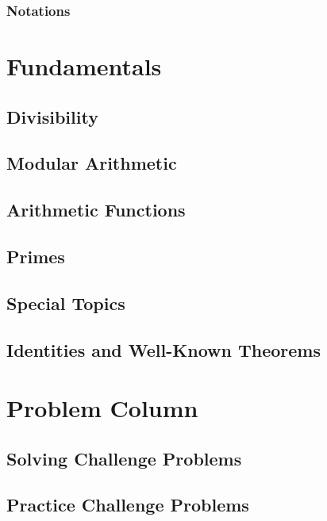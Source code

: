 \documentclass[12pt]{book}
\begin{document}
\dominitoc
\tableofcontents


\pagestyle{myfancy}
		\pagestyle{fancy}
\mainmatter
\setcounter{page}{13}
	\section*{Notations}
	
\part{Fundamentals}
	\chapter{Divisibility}\label{ch:divisibility}
	\minitoc \mtcskip \minilof
		
	\chapter{Modular Arithmetic}\label{ch:congruence}
	\minitoc \mtcskip \minilof
		
	\chapter{Arithmetic Functions}\label{ch:arithfunc}
	\minitoc \mtcskip \minilof
		
	\chapter{Primes}\label{ch:primes}
	\minitoc \mtcskip \minilof
		
	\chapter{Special Topics}\label{ch:special}
	\minitoc \mtcskip \minilof
		
	\begin{appendix}\label{ch:appendices}
		\appendixpage
		\noappendicestocpagenum
		\addappheadtotoc
		\chapter{Identities and Well-Known Theorems}\label{ch:null}
			
	\end{appendix}
	\resumechapters	

\part{Problem Column}
	\chapter{Solving Challenge Problems}\label{ch:solved}
		
	\chapter{Practice Challenge Problems}\label{ch:unsolved}
		
		
\end{document}
